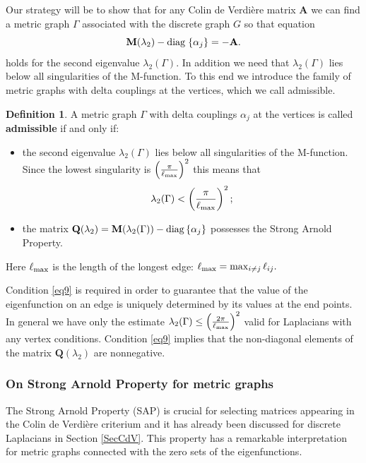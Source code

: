 \documentclass{amsart}
\theoremstyle{definition}
\newtheorem{definition}[theorem]{Definition}
\theoremstyle{remark}
\numberwithin{equation}{section}
\begin{document}
Our strategy will be to show that for any Colin de Verdi\`ere matrix $\mathbf{A}$ we can find a metric graph $ \Gamma $ associated with the discrete graph $ G $ so that
 equation 
 \begin{equation} \label{eq2}
\mathbf M (\lambda_2) - {\rm diag}\; \{ \alpha_j \} = - \mathbf A.
\end{equation}
holds for the second eigenvalue $ \lambda_2 (\Gamma) $. In addition we need
that $ \lambda_2 (\Gamma) $ lies below all singularities of the M-function.
To this end we introduce the family of metric graphs with delta couplings at the vertices,
which we call admissible.

\begin{definition}
A metric graph $ \Gamma $ with delta couplings $ \alpha_j $ at the vertices is called
{\bf admissible} if and only if:
\begin{itemize}
\item the second eigenvalue $ \lambda_2 (\Gamma) $ lies below all singularities 
of the M-function. Since the lowest singularity is $\left( \frac{\pi}{\ell_{\rm max}} \right)^2$ this means that
\begin{equation} \label{eq9}
\lambda_2 (\Gamma) <  \left( \frac{\pi}{\ell_{\rm max}} \right)^2; 
\end{equation}
\item the matrix $ \mathbf Q(\lambda_2) = \mathbf M (\lambda_2 (\Gamma)) - {\rm diag}\, \{\alpha_j \} $
possesses the Strong Arnold Property.
\end{itemize}
\end{definition}

Here $ \ell_{\rm max} $ is the length of the longest edge:
$ \ell_{\rm max} = \max_{i \neq j}  \ell_{ij}. $




Condition \eqref{eq9} is required 
in order to guarantee that the value of the eigenfunction on an edge is
uniquely determined by its values at the end points. In general we have only the estimate $ \lambda_2 (\Gamma) \leq \left( \frac{2 \pi}{\ell_{\rm max}} \right)^2 $
valid for Laplacians with any vertex conditions. Condition \eqref{eq9} implies that the non-diagonal elements of the matrix $ \mathbf Q(\lambda_2) $ are nonnegative.


\subsubsection*{On Strong Arnold Property for metric graphs}  
The Strong Arnold Property (SAP) is crucial for selecting matrices appearing in the Colin de Verdi\`ere criterium and it has already been
discussed for discrete Laplacians  in Section \ref{SecCdV}. This property has a remarkable interpretation for metric graphs
connected with the zero sets of the eigenfunctions.
\end{document}
